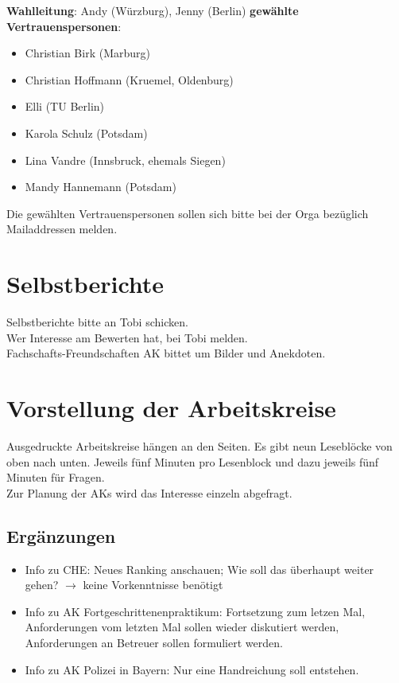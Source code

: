   \begin{info}
    \textbf{Wahlleitung}: Andy (Würzburg), Jenny (Berlin)
    \tcblower
    \textbf{gewählte Vertrauenspersonen}:
    \begin{itemize}
      \item Christian Birk (Marburg)
      \item Christian Hoffmann (Kruemel, Oldenburg)
      \item Elli (TU Berlin)
      \item Karola Schulz (Potsdam)
      \item Lina Vandre (Innsbruck, ehemals Siegen)
      \item Mandy Hannemann (Potsdam)
    \end{itemize}
  \end{info}
  Die gewählten Vertrauenspersonen sollen sich bitte bei der Orga bezüglich Mailaddressen melden.

\section{Selbstberichte}
  Selbstberichte bitte an Tobi schicken. \\
  Wer Interesse am Bewerten hat, bei Tobi melden. \\
  Fachschafts-Freundschaften AK bittet um Bilder und Anekdoten.

\section{Vorstellung der Arbeitskreise}
  Ausgedruckte Arbeitskreise hängen an den Seiten. Es gibt neun Leseblöcke von oben nach unten. Jeweils fünf Minuten pro Lesenblock und dazu jeweils fünf Minuten für Fragen. \\
  Zur Planung der AKs wird das Interesse einzeln abgefragt.

  \subsection{Ergänzungen}
    \begin{itemize}
      \item Info zu CHE: Neues Ranking anschauen; Wie soll das überhaupt weiter gehen? $\rightarrow$ keine Vorkenntnisse benötigt
      \item Info zu AK Fortgeschrittenenpraktikum: Fortsetzung zum letzen Mal, Anforderungen vom letzten Mal sollen wieder diskutiert werden, Anforderungen an Betreuer sollen formuliert werden.
      \item Info zu AK Polizei in Bayern: Nur eine Handreichung soll entstehen.
    \end{itemize}

